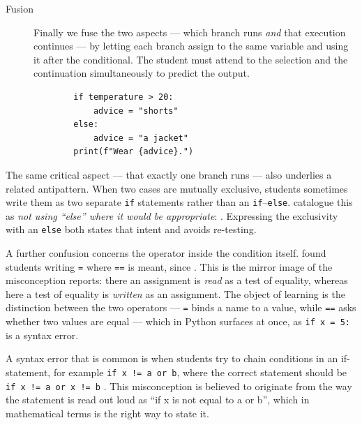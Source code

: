\begin{description}
  \item[Fusion] Finally we fuse the two aspects --- which branch runs \emph{and}
    that execution continues --- by letting each branch assign to the same
    variable and using it after the conditional. The student must attend to the
    selection and the continuation simultaneously to predict the output.

    \hfill
    \begin{minipage}[t]{0.6\columnwidth}
      \begin{verbatim}
        if temperature > 20:
            advice = "shorts"
        else:
            advice = "a jacket"
        print(f"Wear {advice}.")
      \end{verbatim}
    \end{minipage}
\end{description}

The same critical aspect --- that exactly one branch runs --- also underlies a
related antipattern. When two cases are mutually exclusive, students sometimes
write them as two separate \texttt{if} statements rather than an
\texttt{if}--\texttt{else}. \textcite{Bosse2021Antipatterns}
catalogue this as \emph{not using \enquote{else} where it would be appropriate}:
. Expressing the exclusivity with an
\texttt{else} both states that intent and avoids re-testing.

A further confusion concerns the operator inside the condition itself.
\textcite{Bosse2021Antipatterns} found students writing \texttt{=}
where \texttt{==} is meant, since
. This is the mirror image of the misconception
\textcite{Plass2015Variables} reports: there an assignment is \emph{read} as a
test of equality, whereas here a test of equality is \emph{written} as an
assignment. The object of learning is the distinction between the two operators
--- \texttt{=} binds a name to a value, while \texttt{==}
asks whether two values are equal --- which in Python surfaces at once, as
\texttt{if x = 5:} is a syntax error.

A syntax error that is common is when students try to chain conditions in
an if-statement, for example \texttt{if x != a or b}, where the 
correct statement should be \texttt{if x != a or x != b} 
\autocite{GuoMarkelZhang2020}. This misconception is believed to originate 
from the way the statement is read out loud as \enquote{if x is not equal to a 
or b}, which in mathematical terms is the right way to state it. 

